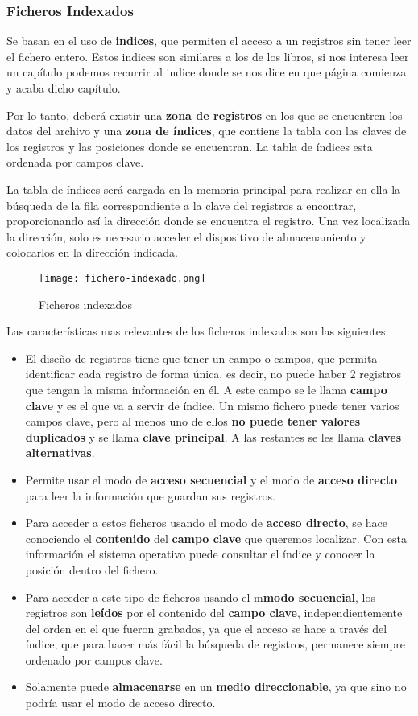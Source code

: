 \subsubsection{Ficheros Indexados}
Se basan en el uso de \textbf{indices}, que permiten el acceso a un registros sin tener leer el fichero entero. Estos indices son similares a los de los libros, si nos interesa leer un capítulo podemos recurrir al indice donde se nos dice en que página comienza y acaba dicho capítulo.

Por lo tanto, deberá existir una \textbf{zona de registros} en los que se encuentren los datos del archivo y una \textbf{zona de índices}, que contiene la tabla con las claves de los registros y las posiciones donde se encuentran. La tabla de índices esta ordenada por campos clave.

La tabla de índices será cargada en la memoria principal para realizar en ella la búsqueda de la fila correspondiente a la clave del registros a encontrar, proporcionando así la dirección donde se encuentra el registro. Una vez localizada la dirección, solo es necesario acceder el dispositivo de almacenamiento y colocarlos en la dirección indicada.

\begin{figure}[ht]
    \centering
    \texttt{[image: fichero-indexado.png]}
    \caption{Ficheros indexados}
\end{figure}

Las características mas relevantes de los ficheros indexados son las siguientes:
\begin{itemize}
    \item El diseño de registros tiene que tener un campo o campos, que permita identificar cada registro de forma única, es decir, no puede haber 2 registros que tengan la misma información en él. A este campo se le llama \textbf{campo clave} y es el que va a servir de índice. Un mismo fichero puede tener varios campos clave, pero al menos uno de ellos \textbf{no puede tener valores duplicados} y se llama \textbf{clave principal}. A las restantes se les llama \textbf{claves alternativas}.
    \item Permite usar el modo de \textbf{acceso secuencial} y el modo de \textbf{acceso directo} para leer la información que guardan sus registros.
    \item Para acceder a estos ficheros usando el modo de \textbf{acceso directo}, se hace conociendo el \textbf{contenido} del \textbf{campo clave} que queremos localizar. Con esta información el sistema operativo puede consultar el índice y conocer la posición dentro del fichero.
    \item Para acceder a este tipo de ficheros usando el m\textbf{modo secuencial}, los registros son \textbf{leídos} por el contenido del \textbf{campo clave}, independientemente del orden en el que fueron grabados, ya que el acceso se hace a través del índice, que para hacer más fácil la búsqueda de registros, permanece siempre ordenado por campos clave.
    \item Solamente puede \textbf{almacenarse} en un \textbf{medio direccionable}, ya que sino no podría usar el modo de acceso directo.
\end{itemize}


